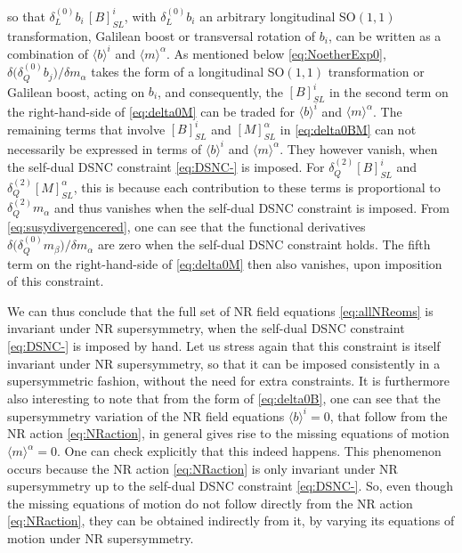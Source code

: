 \documentclass[a4paper,10pt,openany]{article}
\begin{document}
	so that $\delta^{(0)}_L b_i\,[B]_{SL}^i$, with $\delta^{(0)}_L b_i$ an arbitrary longitudinal SO$(1,1)$ transformation, Galilean boost or transversal rotation of $b_i$, can be written as a combination of $\langle b \rangle^i$ and $\langle m \rangle^\alpha$. As mentioned below \eqref{eq:NoetherExp0}, $\delta\big(\delta_Q^{(0)}b_j\big)/\delta m_\alpha$ takes the form of a longitudinal SO$(1,1)$ transformation or Galilean boost, acting on $b_i$, and consequently, the $[B]^i_{SL}$ in the second term on the right-hand-side of \eqref{eq:delta0M} can be traded for $\langle b \rangle^i$ and $\langle m \rangle^\alpha$. The remaining terms that involve $[B]_{SL}^i$ and $[M]_{SL}^\alpha$ in \eqref{eq:delta0BM} can not necessarily be expressed in terms of $\langle b \rangle^i$ and $\langle m \rangle^\alpha$. They however vanish, when the self-dual DSNC constraint \eqref{eq:DSNC-} is imposed. For $\delta_Q^{(2)}[B]_{SL}^i$ and $\delta_Q^{(2)}[M]_{SL}^\alpha$, this is because each contribution to these terms is proportional to $\delta_Q^{(2)} m_\alpha$ and thus vanishes when the self-dual DSNC constraint is imposed. From \eqref{eq:susydivergencered}, one can see that the functional derivatives $\delta\big(\delta_Q^{(0)}m_\beta\big)/\delta m_\alpha$ are zero when the self-dual DSNC constraint holds. The fifth term on the right-hand-side of \eqref{eq:delta0M} then also vanishes, upon imposition of this constraint.
	
	We can thus conclude that the full set of NR field equations \eqref{eq:allNReoms} is invariant under NR supersymmetry, when the self-dual DSNC constraint \eqref{eq:DSNC-} is imposed by hand. Let us stress again that this constraint is itself invariant under NR supersymmetry, so that it can be imposed consistently in a supersymmetric fashion, without the need for extra constraints. It is furthermore also interesting to note that from the form of \eqref{eq:delta0B}, one can see that the supersymmetry variation of the NR field equations $\langle b \rangle^i = 0$, that follow from the NR action \eqref{eq:NRaction}, in general gives rise to the missing equations of motion $\langle m \rangle^\alpha = 0$. One can check explicitly that this indeed happens. This phenomenon occurs because the NR action \eqref{eq:NRaction} is only invariant under NR supersymmetry up to the self-dual DSNC constraint \eqref{eq:DSNC-}. So, even though the missing equations of motion do not follow directly from the NR action \eqref{eq:NRaction}, they can be obtained indirectly from it, by varying its equations of motion under NR supersymmetry.
	
\end{document}

